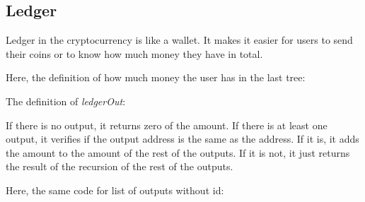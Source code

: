 \subsection{Ledger}

Ledger in the cryptocurrency is like a wallet.
It makes it easier for users to send their coins or to know how much money they have in total.

Here, the definition of how much money the user has in the last tree:


The definition of \emph{ledgerOut}:


If there is no output, it returns zero of the amount.
If there is at least one output, it verifies if the output address is the same as the address.
If it is, it adds the amount to the amount of the rest of the outputs.
If it is not, it just returns the result of the recursion of the rest of the outputs.

Here, the same code for list of outputs without id:

